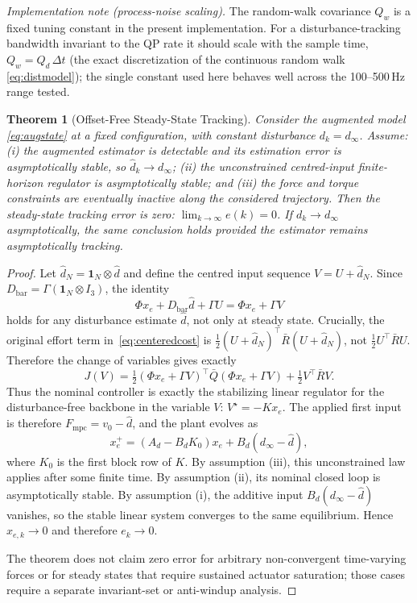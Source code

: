 \documentclass[journal]{IEEEtran}
\newtheorem{theorem}{Theorem}
\newcommand{\Fmpc}{F_{\text{mpc}}}
\begin{document}
\textit{Implementation note (process-noise scaling).}
The random-walk covariance $Q_w$ is a fixed tuning constant in the present
implementation. For a disturbance-tracking bandwidth invariant to the QP rate
it should scale with the sample time, $Q_w=Q_d\,\Delta t$ (the exact
discretization of the continuous random walk \eqref{eq:distmodel}); the single
constant used here behaves well across the 100--500\,Hz range tested.

\begin{theorem}[Offset-Free Steady-State Tracking]\label{thm:zss}
Consider the augmented model \eqref{eq:augstate} at a fixed
configuration, with constant disturbance $d_k=d_\infty$. Assume:
(i) the augmented estimator is detectable and its estimation error is
asymptotically stable, so $\hat d_{k}\to d_\infty$; (ii) the unconstrained
centred-input finite-horizon regulator is asymptotically stable; and
(iii) the force and torque constraints are eventually inactive along the
considered trajectory. Then the
steady-state tracking error is zero:
$\lim_{k\to\infty}e(k)=0$. If $d_k\to d_\infty$ asymptotically, the
same conclusion holds provided the estimator remains asymptotically
tracking.
\end{theorem}
\begin{proof}
Let $\hat d_N=\mathbf 1_N\otimes\hat d$ and define the centred input sequence
$V=U+\hat d_N$. Since $D_{\text{bar}}=\Gamma(\mathbf 1_N\otimes I_3)$, the
identity
\[
  \Phi x_e+D_{\text{bar}}\hat d+\Gamma U=\Phi x_e+\Gamma V
\]
holds for any disturbance estimate $\hat d$, not only at steady state.
Crucially, the original effort term in~\eqref{eq:centeredcost} is
$\tfrac12(U+\hat d_N)^\top\bar R(U+\hat d_N)$, not
$\tfrac12U^\top\bar RU$. Therefore the change of variables gives exactly
\begin{equation*}
 J(V)=\tfrac12(\Phi x_e+\Gamma V)^\top\bar Q(\Phi x_e+\Gamma V)
 +\tfrac12 V^\top\bar R V .
\end{equation*}
Thus the nominal controller is exactly the stabilizing linear regulator for
the disturbance-free backbone in the variable $V$: $V^\star=-Kx_e$. The
applied first input is therefore $\Fmpc=v_0-\hat d$, and the plant evolves as
\begin{equation*}
  x_e^+=(A_d-B_dK_0)x_e+B_d(d_\infty-\hat d),
\end{equation*}
where $K_0$ is the first block row of $K$. By assumption (iii), this
unconstrained law applies after some finite time. By assumption (ii), its nominal
closed loop is asymptotically stable. By assumption (i), the additive input
$B_d(d_\infty-\hat d)$ vanishes, so the stable linear system converges to the
same equilibrium. Hence $x_{e,k}\to0$ and therefore $e_k\to0$.

The theorem does not claim zero error for arbitrary non-convergent
time-varying forces or for steady states that require sustained actuator
saturation; those cases require a separate invariant-set or anti-windup
analysis.
\end{proof}
\end{document}
